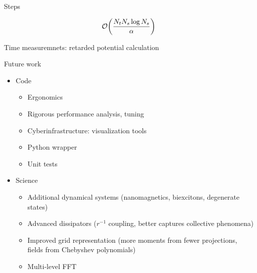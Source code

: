 \documentclass[aspectratio=169, usenames, dvipsnames]{beamer}
\begin{document}
\begin{frame}{Steps}
\begin{center}
  \end{center}
\end{frame}

\begin{frame}[standout]
  \begingroup
    \Huge
    \begin{equation*}
      \mathcal{O}\qty(\frac{N_t N_s \log N_s}{\alpha})
    \end{equation*}
  \endgroup
\end{frame}

\begin{frame}{Time measuremnets: retarded potential calculation}
  
\end{frame}

\begin{frame}{Future work}
  \begin{itemize}
    \item[] Code
      \begin{itemize}
        \item Ergonomics
        \item Rigorous performance analysis, tuning
        \item Cyberinfrastructure: visualization tools
        \item Python wrapper
        \item Unit tests
      \end{itemize}

    \item[] Science
      \begin{itemize}
        \item Additional dynamical systems (nanomagnetics, biexcitons, degenerate states)
        \item Advanced dissipators ($r^{-1}$ coupling, better captures collective phenomena)
        \item Improved grid representation (more moments from fewer projections, fields from Chebyshev polynomials)
        \item Multi-level FFT
      \end{itemize}
  \end{itemize}
\end{frame}
\end{document}
